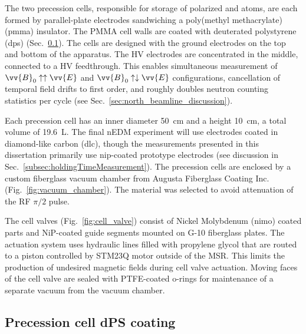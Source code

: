 The two precession cells, responsible for storage of polarized \ucn and \hg atoms, are each formed by parallel-plate electrodes sandwiching a poly(methyl methacrylate) (\acrshort*{pmma}) insulator. The PMMA cell walls are coated with deuterated polystyrene (\acrshort*{dps}) (Sec.~\ref{sec:dPS_coating}). The cells are designed with the ground electrodes on the top and bottom of the apparatus. The HV electrodes are concentrated in the middle, connected to a HV feedthrough. This enables simultaneous measurement of $\vv{B}_0\uparrow\uparrow\vv{E}$ and $\vv{B}_0\uparrow\downarrow\vv{E}$ configurations, cancellation of temporal field drifts to first order, and roughly doubles neutron counting statistics per cycle (see Sec.~\ref{sec:north_beamline_discussion}).

Each precession cell has an inner diameter \qty{50}{cm} and a height \qty{10}{cm}, a total volume of \qty{19.6}{\liter}. The final nEDM experiment will use electrodes coated in diamond-like carbon (\acrshort*{dlc}), though the measurements presented in this dissertation primarily use \acrshort{nip}-coated prototype electrodes (see discussion in Sec.~\ref{subsec:holdingTimeMeasurement}). The precession cells are enclosed by a custom fiberglass vacuum chamber from Augusta Fiberglass Coating Inc. (Fig.~\ref{fig:vacuum_chamber}). The material was selected to avoid attenuation of the RF $\pi/2$ pulse.

The cell valves (Fig.~\ref{fig:cell_valve}) consist of Nickel Molybdenum (\acrshort*{nimo}) coated parts and NiP-coated guide segments mounted on G-10 fiberglass plates. The actuation system uses hydraulic lines filled with propylene glycol that are routed to a piston controlled by STM23Q motor outside of the MSR. This limits the production of undesired magnetic fields during cell valve actuation. Moving faces of the cell valve are sealed with PTFE-coated o-rings for maintenance of a separate vacuum from the vacuum chamber.


\subsection{Precession cell dPS coating}\label{sec:dPS_coating}


